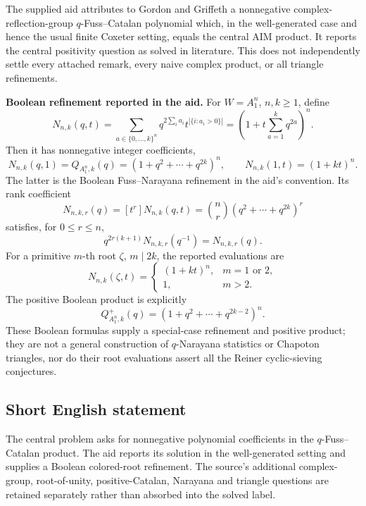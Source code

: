 \documentclass[11pt]{article}
\begin{document}
The supplied aid attributes to Gordon and Griffeth a nonnegative complex-reflection-group \(q\)-Fuss--Catalan polynomial which, in the well-generated case and hence the usual finite Coxeter setting, equals the central AIM product. It reports the central positivity question as solved in literature. This does not independently settle every attached remark, every naive complex product, or all triangle refinements.

\textbf{Boolean refinement reported in the aid.} For \(W=A_1^n\), \(n,k\ge1\), define
\[
 N_{n,k}(q,t)=\sum_{a\in\{0,\ldots,k\}^n}
 q^{2\sum_i a_i}t^{|\{i:a_i>0\}|}
 =\left(1+t\sum_{a=1}^kq^{2a}\right)^n.
\]
Then it has nonnegative integer coefficients,
\[
 N_{n,k}(q,1)=Q_{A_1^n,k}(q)
       =(1+q^2+\cdots+q^{2k})^n,
 \qquad N_{n,k}(1,t)=(1+kt)^n.
\]
The latter is the Boolean Fuss--Narayana refinement in the aid's convention. Its rank coefficient
\[
 N_{n,k,r}(q)=[t^r]N_{n,k}(q,t)
 =\binom nr(q^2+\cdots+q^{2k})^r
\]
satisfies, for \(0\le r\le n\),
\[
 q^{2r(k+1)}N_{n,k,r}(q^{-1})=N_{n,k,r}(q).
\]
For a primitive \(m\)-th root \(\zeta\), \(m\mid2k\), the reported evaluations are
\[
 N_{n,k}(\zeta,t)=
 \begin{cases}(1+kt)^n,&m=1\text{ or }2,\\1,&m>2.\end{cases}
\]
The positive Boolean product is explicitly
\[
 Q^+_{A_1^n,k}(q)=(1+q^2+\cdots+q^{2k-2})^n.
\]
These Boolean formulas supply a special-case refinement and positive product; they are not a general construction of \(q\)-Narayana statistics or Chapoton triangles, nor do their root evaluations assert all the Reiner cyclic-sieving conjectures.
\subsection{Short English statement}
The central problem asks for nonnegative polynomial coefficients in the \(q\)-Fuss--Catalan product. The aid reports its solution in the well-generated setting and supplies a Boolean colored-root refinement. The source's additional complex-group, root-of-unity, positive-Catalan, Narayana and triangle questions are retained separately rather than absorbed into the solved label.
\end{document}

